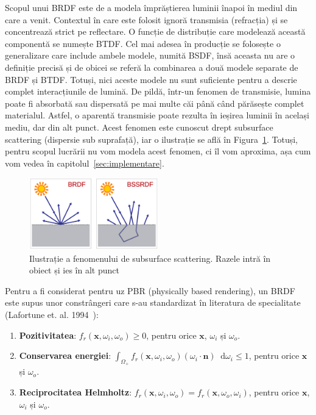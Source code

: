 \documentclass[12pt,a4paper]{report}
\newcommand*\diff{\mathop{}\!\mathrm{d}}
\numberwithin{equation}{section} %
\begin{document}
Scopul unui BRDF este de a modela împrăștierea luminii înapoi în mediul din care a venit.
Contextul în care este folosit ignoră transmisia (refracția) și se concentrează strict
pe reflectare. O funcție de distribuție care modelează această componentă se numește
BTDF. Cel mai adesea în producție se folosește o generalizare care include ambele
modele, numită BSDF, însă aceasta nu are o definiție precisă și de obicei se referă
la combinarea a două modele separate de BRDF și BTDF. Totuși, nici aceste modele nu sunt
suficiente pentru a descrie complet interacțiunile de lumină. De pildă, într-un fenomen
de transmisie, lumina poate fi absorbată sau dispersată pe mai multe căi până când
părăsește complet materialul. Astfel, o aparentă transmisie poate rezulta în ieșirea
luminii în același mediu, dar din alt punct. Acest fenomen este cunoscut drept
subsurface scattering (dispersie sub suprafață), iar o ilustrație se află în Figura~\ref{fig:sss}.
Totuși, pentru scopul lucrării nu vom modela acest fenomen, ci îl vom aproxima,
așa cum vom vedea în capitolul~\ref{sec:implementare}.

\begin{figure}[ht]
	\centering
	\includegraphics[width=0.5\textwidth]{pics/bssrdf.png}
	\caption{Ilustrație a fenomenului de subsurface scattering. Razele intră în obiect și ies în alt punct\protect{}}
	\label{fig:sss}
\end{figure}

Pentru a fi considerat pentru uz PBR (physically based rendering), un BRDF
este supus unor constrângeri care s-au standardizat în literatura de specialitate
(Lafortune et. al. 1994~\cite{Lafortune}):

\begin{enumerate}
	\item \textbf{Pozitivitatea}: $f_r(\mathbf{x}, \omega_i, \omega_o) \geq 0$, pentru orice $\mathbf{x}$, $\omega_i$ și $\omega_o$.
	\item \textbf{Conservarea energiei}: $\int_{\Omega_+} f_r(\mathbf{x}, \omega_i, \omega_o) (\omega_i \cdot \mathbf{n}) \diff \omega_i \leq 1$, pentru orice $\mathbf{x}$ și $\omega_o$.
	\item \textbf{Reciprocitatea Helmholtz}: $f_r(\mathbf{x}, \omega_i, \omega_o) = f_r(\mathbf{x}, \omega_o, \omega_i)$, pentru orice $\mathbf{x}$, $\omega_i$ și $\omega_o$.
\end{enumerate}
\end{document}
